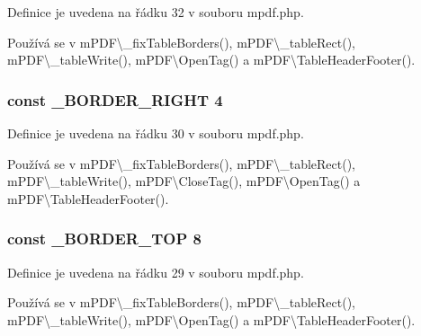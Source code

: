 Definice je uvedena na řádku 32 v souboru mpdf.\-php.



Používá se v m\-P\-D\-F\textbackslash{}\-\_\-fix\-Table\-Borders(), m\-P\-D\-F\textbackslash{}\-\_\-table\-Rect(), m\-P\-D\-F\textbackslash{}\-\_\-table\-Write(), m\-P\-D\-F\textbackslash{}\-Open\-Tag() a m\-P\-D\-F\textbackslash{}\-Table\-Header\-Footer().

\hypertarget{mpdf_8php_a2021fc1de100f2a108b0802f45ec4643}{
\subsubsection[{\-\_\-\-B\-O\-R\-D\-E\-R\-\_\-\-R\-I\-G\-H\-T}]{\setlength{\rightskip}{0pt plus 5cm}const \-\_\-\-B\-O\-R\-D\-E\-R\-\_\-\-R\-I\-G\-H\-T 4}}\label{mpdf_8php_a2021fc1de100f2a108b0802f45ec4643}


Definice je uvedena na řádku 30 v souboru mpdf.\-php.



Používá se v m\-P\-D\-F\textbackslash{}\-\_\-fix\-Table\-Borders(), m\-P\-D\-F\textbackslash{}\-\_\-table\-Rect(), m\-P\-D\-F\textbackslash{}\-\_\-table\-Write(), m\-P\-D\-F\textbackslash{}\-Close\-Tag(), m\-P\-D\-F\textbackslash{}\-Open\-Tag() a m\-P\-D\-F\textbackslash{}\-Table\-Header\-Footer().

\hypertarget{mpdf_8php_ae41857e1278b10fd7d4b73883a626dd9}{
\subsubsection[{\-\_\-\-B\-O\-R\-D\-E\-R\-\_\-\-T\-O\-P}]{\setlength{\rightskip}{0pt plus 5cm}const \-\_\-\-B\-O\-R\-D\-E\-R\-\_\-\-T\-O\-P 8}}\label{mpdf_8php_ae41857e1278b10fd7d4b73883a626dd9}


Definice je uvedena na řádku 29 v souboru mpdf.\-php.



Používá se v m\-P\-D\-F\textbackslash{}\-\_\-fix\-Table\-Borders(), m\-P\-D\-F\textbackslash{}\-\_\-table\-Rect(), m\-P\-D\-F\textbackslash{}\-\_\-table\-Write(), m\-P\-D\-F\textbackslash{}\-Open\-Tag() a m\-P\-D\-F\textbackslash{}\-Table\-Header\-Footer().

